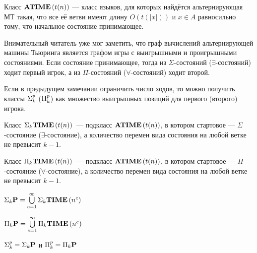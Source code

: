 \begin{definition}
Класс $\textbf{ATIME}\left({t(n)}\right)$ — класс языков, для которых найдётся альтернирующая МТ такая, что все её ветви имеют длину $O(t(|x|))$ и $x \in A$ равносильно тому, что начальное состояние принимающее.
\end{definition}

\begin{note} Внимательный читатель уже мог заметить, что граф вычислений альтернирующей машины Тьюринга является графом игры с выигрышными и проигрышными состояниями. Если состояние принимающее, тогда из $\Sigma$-состояний ($\exists$-состояний) ходит первый игрок, а из $\Pi$-состояний ($\forall$-состояний) ходит второй.
\end{note}

\begin{note} Если в предыдущем замечании ограничить число ходов, то можно получить классы $\textbf{$\Sigma_{k}^p$}$ ($\textbf{$\Pi_{k}^p$}$) как множество выигрышных позиций для первого (второго) игрока.
\end{note}

\begin{definition}
Класс $\textbf{$\Sigma_{k}$TIME}\left({t(n)}\right)$~--- подкласс $\textbf{ATIME}\left({t(n)}\right)$, в котором стартовое — $\Sigma$-состояние ($\exists$-состояние), а количество перемен вида состояния на любой ветке не превысит $k - 1$.
\end{definition}

\begin{definition}
Класс $\textbf{$\Pi_{k}$TIME}\left({t(n)}\right)$~--- подкласс $\textbf{ATIME}\left({t(n)}\right)$, в котором стартовое — $\Pi$-состояние ($\forall$-состояние), а количество перемен вида состояния на любой ветке не превысит $k - 1$.
\end{definition}

\begin{definition}
$\textbf{$\Sigma_{k}$P} = \bigcup\limits_{c = 1}^\infty \textbf{$\Sigma_{k}$TIME}\left({n^c}\right)$
\end{definition}

\begin{definition}
$\textbf{$\Pi_{k}$P} = \bigcup\limits_{c = 1}^\infty \textbf{$\Pi_{k}$TIME}\left({n^c}\right)$
\end{definition}

\begin{theorem}
$\textbf{$\Sigma_{k}^p$} = \textbf{$\Sigma_{k}$P}$ и $\textbf{$\Pi_{k}^p$} = \textbf{$\Pi_{k}$P}$
\end{theorem}


